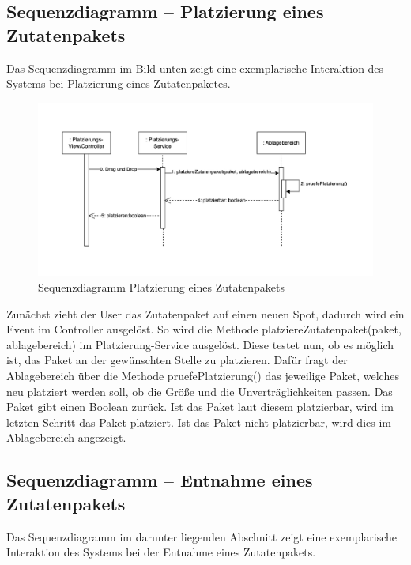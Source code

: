 \subsection{Sequenzdiagramm – Platzierung eines Zutatenpakets}
Das Sequenzdiagramm im Bild unten zeigt eine exemplarische Interaktion des Systems bei Platzierung eines Zutatenpaketes.

\begin{figure}[H]
    \centering
    \includegraphics[width=1\textwidth]{Bilder/Kapitel/Laufzeitsicht/Sequenzdiagramm_Platzierung-Zutatenpaket}
    \caption{Sequenzdiagramm Platzierung eines Zutatenpakets}
    \label{fig:Sequenzdiagramm_Platzierung_Zutatenpaket}
\end{figure}

Zunächst zieht der User das Zutatenpaket auf einen neuen Spot, dadurch wird ein Event im Controller ausgelöst. So wird
die Methode platziereZutatenpaket(paket, ablagebereich) im Platzierung-Service ausgelöst. Diese testet nun, ob es
möglich ist, das Paket an der gewünschten Stelle zu platzieren. Dafür fragt der Ablagebereich über die Methode
pruefePlatzierung() das jeweilige Paket, welches neu platziert werden soll, ob die Größe und die Unverträglichkeiten
passen. Das Paket gibt einen Boolean zurück. Ist das Paket laut diesem platzierbar, wird im letzten Schritt das Paket
platziert. Ist das Paket nicht platzierbar, wird dies im Ablagebereich angezeigt.

\subsection{Sequenzdiagramm – Entnahme eines Zutatenpakets}
Das Sequenzdiagramm im darunter liegenden Abschnitt zeigt eine exemplarische Interaktion des Systems bei der Entnahme eines Zutatenpakets.


